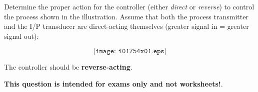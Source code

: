 

Determine the proper action for the controller (either {\it direct} or {\it reverse}) to control the process shown in the illustration.  Assume that both the process transmitter and the I/P transducer are direct-acting themselves (greater signal in = greater signal out):

$$\texttt{[image: i01754x01.eps]}$$







The controller should be {\bf reverse-acting}.







{\bf This question is intended for exams only and not worksheets!}.



